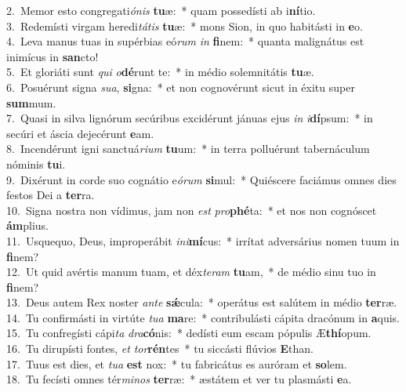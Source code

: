 {2.~}Memor esto congregati\textit{ó}\textit{nis} \textbf{tu}æ:~* quam possedísti ab i\textbf{ní}tio.\\
{3.~}Redemísti virgam heredi\textit{tá}\textit{tis} \textbf{tu}æ:~* mons Sion, in quo habitásti in \textbf{e}o.\\
{4.~}Leva manus tuas in supérbias eó\textit{rum} \textit{in} \textbf{fi}nem:~* quanta malignátus est inimícus in \textbf{san}cto!\\
{5.~}Et gloriáti sunt \textit{qui} \textit{o}\textbf{dé}runt te:~* in médio solemnitátis \textbf{tu}æ.\\
{6.~}Posuérunt signa \textit{su}\textit{a}, \textbf{si}gna:~* et non cognovérunt sicut in éxitu super \textbf{sum}mum.\\
{7.~}Quasi in silva lignórum secúribus excidérunt jánuas ejus \textit{in} \textit{i}\textbf{dí}psum:~* in secúri et áscia dejecérunt \textbf{e}am.\\
{8.~}Incendérunt igni sanctuá\textit{ri}\textit{um} \textbf{tu}um:~* in terra polluérunt tabernáculum nóminis \textbf{tu}i.\\
{9.~}Dixérunt in corde suo cognátio e\textit{ó}\textit{rum} \textbf{si}mul:~* Quiéscere faciámus omnes dies festos Dei a \textbf{ter}ra.\\
{10.~}Signa nostra non vídimus, jam non \textit{est} \textit{pro}\textbf{phé}ta:~* et nos non cognóscet \textbf{ám}plius.\\
{11.~}Usquequo, Deus, improperábit \textit{i}\textit{ni}\textbf{mí}cus:~* irrítat adversárius nomen tuum in \textbf{fi}nem?\\
{12.~}Ut quid avértis manum tuam, et déx\textit{te}\textit{ram} \textbf{tu}am,~* de médio sinu tuo in \textbf{fi}nem?\\
{13.~}Deus autem Rex noster \textit{an}\textit{te} \textbf{sǽ}cula:~* operátus est salútem in médio \textbf{ter}ræ.\\
{14.~}Tu confirmásti in virtúte \textit{tu}\textit{a} \textbf{ma}re:~* contribulásti cápita dracónum in \textbf{a}quis.\\
{15.~}Tu confregísti cápi\textit{ta} \textit{dra}\textbf{có}nis:~* dedísti eum escam pópulis Æ\textbf{thí}opum.\\
{16.~}Tu dirupísti fontes, \textit{et} \textit{tor}\textbf{rén}tes~* tu siccásti flúvios \textbf{E}than.\\
{17.~}Tuus est dies, et \textit{tu}\textit{a} \textbf{est} nox:~* tu fabricátus es auróram et \textbf{so}lem.\\
{18.~}Tu fecísti omnes tér\textit{mi}\textit{nos} \textbf{ter}ræ:~* æstátem et ver tu plasmásti \textbf{e}a.\\
